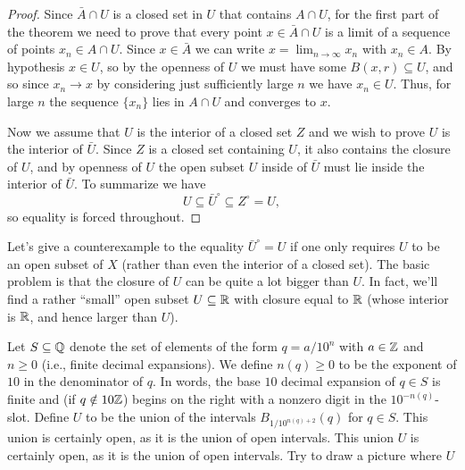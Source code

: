 \begin{proof}
  Since \(\bar A\cap U\) is a closed set in \(U\) that contains
  \(A\cap U\), for the first part of the theorem we need to prove that
  every point \(x\in\bar A\cap U\) is a limit of a sequence of points
  \(x_n\in A\cap U\). Since \(x\in\bar A\) we can write
  \(x=\lim_{n\to\infty}x_n\) with \(x_n\in A\). By hypothesis \(x\in U\),
  so by the openness of \(U\) we must have some \(B(x,r)\subseteq U\), and
  so since \(x_n\to x\) by considering just sufficiently large \(n\) we
  have \(x_n\in U\). Thus, for large \(n\) the sequence \(\{x_n\}\) lies in
  \(A\cap U\) and converges to \(x\).

  Now we assume that \(U\) is the interior of a closed set \(Z\) and we
  wish to prove \(U\) is the interior of \(\bar U\). Since \(Z\) is a
  closed set containing \(U\), it also contains the closure of \(U\), and
  by openness of \(U\) the open subset \(U\) inside of \(\bar U\) must lie
  inside the interior of \(\bar U\). To summarize we have
  \[
    U\subseteq{\bar U}^\circ\subseteq Z^\circ=U,
  \]
  so equality is forced throughout.
\end{proof}

Let's give a counterexample to the equality \({\bar U}^\circ=U\) if one
only requires \(U\) to be an open subset of \(X\) (rather than even the
interior of a closed set). The basic problem is that the closure of \(U\)
can be quite a lot bigger than \(U\). In fact, we'll find a rather
``small'' open subset \(U\subseteq\mathbb{R}\) with closure equal to \(\mathbb{R}\)
(whose interior is \(\mathbb{R}\), and hence larger than \(U\)).

Let \(S\subseteq\mathbb{Q}\) denote the set of elements of the form \(q=a/10^n\)
with \(a\in\mathbb{Z}\) and \(n\geq 0\) (i.e., finite decimal expansions). We
define \(n(q)\geq 0\) to be the exponent of \(10\) in the denominator of
\(q\). In words, the base \(10\) decimal expansion of \(q\in S\) is finite
and (if \(q\notin 10\mathbb{Z}\)) begins on the right with a nonzero digit in the
\(10^{-n(q)}\)-slot. Define \(U\) to be the union of the intervals
\(B_{1/10^{n(q)+2}}(q)\) for \(q\in S\). This union is certainly open, as
it is the union of open intervals. This union \(U\) is certainly open, as
it is the union of open intervals. Try to draw a picture where \(U\)

